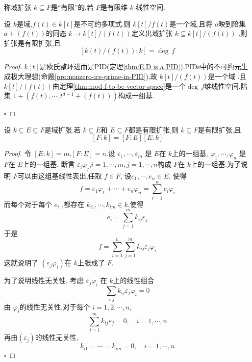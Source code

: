 \documentclass[lang=cn,12pt,color=green,fontset=none,pad]{elegantbook}
\begin{document}
\begin{definition}
    称域扩张 \(  k\subseteq F  \)是“有限”的,若 \(  F  \)是有限维 \(  k  \)-线性空间.   
\end{definition}

\begin{lemma}
    设 \(  k  \)是域,\(  f\left( t \right)\in k[t]   \)是不可约多项式.则 \(  k[t]/f\left( t \right)   \)是一个域,且将 \(  a  \)映到陪集 \(  a+ \left( f\left( t \right)  \right)   \)的同态 \(  k\to k[t]/\left( f\left( t \right)  \right)   \)定义出域扩张 \(  k\subseteq k[t]/\left( f\left( t \right)  \right)   \)     .则扩张是有限扩张,且 \[
    [k\left( t \right)/\left( f\left( t \right)  \right):k  ]= \operatorname{deg}\,f
    \]
\end{lemma}
\begin{proof}
    \(  k[t]  \)是欧氏整环进而是PID(定理\ref{thm:E.D is a PID}),PIDs中的不可约元生成极大理想(命题\ref{pro:nonzero-ire-prime-in-PID}),故 \(  k[t]/\left( f\left( t \right)  \right)   \)是一个域 .且\(  k[t]/\left( f\left( t \right)  \right)   \)由定理\ref{thm:mod-f-to-be-vector-space}是一个\(  \operatorname{deg}\,f  \)维线性空间,陪集 \(  1+ \left( f\left( t \right),\cdots ,t ^{d-1}+ \left( f\left( t \right)  \right)   \right)   \)构成一组基.    

    \hfill $\square$
\end{proof}

\begin{proposition}\label{dim-fomu}
    设 \(  k\subseteq E\subseteq F  \)是域扩张.若 \(  k\subseteq E  \)和 \(  E\subseteq F  \)都是有限扩张,则 \(  k\subseteq F  \)是有限扩张,且 \[
    [F:k]=[F:E][E:k]
    \]    
\end{proposition}
\begin{proof}
    令 \(  [E:k]=m  \),\(  [F :E]=n  \).设 \(   \varepsilon_1,\cdots , \varepsilon _{m}  \)   是 \(  E  \)在 \(  k  \)上的一组基, \(  \varphi_1,\cdots ,\varphi _{n}  \)   是 \(  F   \)在 \(  E  \)上的一组基.  
    断言 \(   \varepsilon _{i}\varphi _{j}  \),\(  i= 1,\cdots,m ,j= 1,\cdots,n   \)构成 \(  F  \)在 \(  k  \)上的一组基.为了说明 \(  F   \)可以由这组基线性表出,任取 \(  f \in F  \), 设\(   e_1,\cdots,e_n \in   E\),  使得 \[
    f= e_1\varphi_1+ \cdots+  e_{n}\varphi _{n}= \sum _{i=1}^{n}e_{i}\varphi _{i}
    \]而每个对于每个 \(  e_{i}  \) ,都存在 \(  k_{i1},\cdots ,k_{im} \in  k \),使得 \[
    e_{i}= \sum _{j=1}^{m} k_{ij} \varepsilon _{j}
    \] 于是 \[
    f= \sum _{i=1}^{n}\sum _{j=1}^{m} k_{ij} \varepsilon _{j}\varphi _{i}
    \]这就说明了 \(  \left(  \varepsilon _{j}\varphi _{i} \right)   \)在 \(  k  \)上张成了 \(  F  \).

    为了说明线性无关性,   考虑 \(   \varepsilon _{j}\varphi _{i}  \) 在 \(  k  \)上的线性组合 \[
    \sum _{i,j} k_{ij}  \varepsilon _{j}\varphi _{i}=0
    \] 由 \(  \varphi _{i}  \)的线性无关性,对于每个 \(  i=1,2,\cdots,n  \), \[
    \sum _{j=1}^{m} k_{ij} \varepsilon _{j}=0 ,\quad  i= 1,\cdots,n 
    \]  再由\(  \left(  \varepsilon _{j} \right)   \)的线性无关性,\[
    k_{i 1}= \cdots = k_{i m}=0,\quad  i= 1,\cdots,n 
    \] 
    \hfill $\square$
\end{proof}
\end{document}
